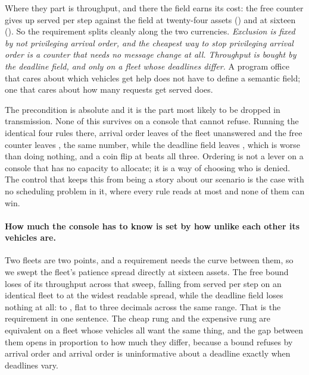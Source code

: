 \documentclass[11pt]{article}
\begin{document}
Where they part is throughput, and there the field earns its cost: the free counter gives up \RnFreeVsFieldSrvTwentyFour{} served per step against the field at twenty-four assets (\RnFreeVsFieldSrvTwentyFourV{}) and \RnFreeVsFieldSrvSixteen{} at sixteen (\RnFreeVsFieldSrvSixteenV{}). So the requirement splits cleanly along the two currencies. \emph{Exclusion is fixed by not privileging arrival order, and the cheapest way to stop privileging arrival order is a counter that needs no message change at all. Throughput is bought by the deadline field, and only on a fleet whose deadlines differ.} A program office that cares about which vehicles get help does not have to define a semantic field; one that cares about how many requests get served does.

The precondition is absolute and it is the part most likely to be dropped in transmission. None of this survives on a console that cannot refuse. Running the identical four rules there, arrival order leaves \RnBlindFcfs{} of the fleet unanswered and the free counter leaves \RnBlindRr{}, the same number, while the deadline field leaves \RnBlindEdf{}, which is worse than doing nothing, and a coin flip at \RnBlindRand{} beats all three. Ordering is not a lever on a console that has no capacity to allocate; it is a way of choosing who is denied. The control that keeps this from being a story about our scenario is the case with no scheduling problem in it, where every rule reads at most \RnControlMax{} and none of them can win.

\paragraph{How much the console has to know is set by how unlike each other its vehicles are.} Two fleets are two points, and a requirement needs the curve between them, so we swept the fleet's patience spread directly at sixteen assets. The free bound loses \LdHBoundLoss{} of its throughput across that sweep, falling from \LdHBoundTwoSZero{} served per step on an identical fleet to \LdHBoundTwoSTwelve{} at the widest readable spread, while the deadline field loses nothing at all: \LdHAdmitsSZero{} to \LdHAdmitsSTwelve{}, flat to three decimals across the same range. That is the requirement in one sentence. The cheap rung and the expensive rung are equivalent on a fleet whose vehicles all want the same thing, and the gap between them opens in proportion to how much they differ, because a bound refuses by arrival order and arrival order is uninformative about a deadline exactly when deadlines vary.
\end{document}
